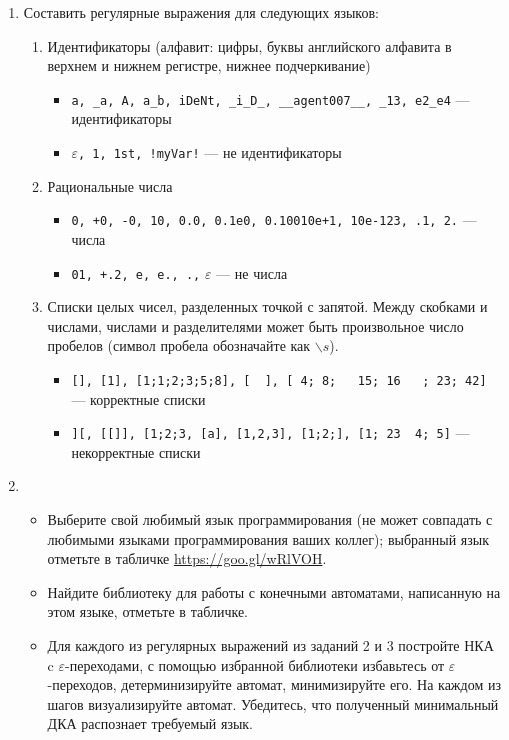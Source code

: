 \documentclass[12pt]{article}
\begin{document}
\begin{enumerate}
  \item
  { Составить регулярные выражения для следующих языков: 
    \begin{enumerate}
      \item 
      { Идентификаторы (алфавит: цифры, буквы английского алфавита в верхнем и нижнем регистре, нижнее подчеркивание)
        \begin{itemize}
          \item \verb;a, _a, A, a_b, iDeNt, _i_D_, __agent007__, _13, e2_e4; --- идентификаторы
          \item $\varepsilon$\verb;, 1, 1st, !myVar!; --- не идентификаторы
        \end{itemize}
      }
      \item 
      { Рациональные числа
        \begin{itemize} 
          \item \verb;0, +0, -0, 10, 0.0, 0.1e0, 0.10010e+1, 10e-123, .1, 2.; --- числа
          \item \verb;01, +.2, e, e., .,; $\varepsilon$ --- не числа
        \end{itemize}
      }
      \item
      { Списки целых чисел, разделенных точкой с запятой. Между скобками и числами, числами и разделителями может быть произвольное число пробелов (символ пробела обозначайте как $\backslash s$). 
        \begin{itemize} 
          \item \verb![], [1], [1;1;2;3;5;8], [  ], [ 4; 8;   15; 16   ; 23; 42]! --- корректные списки
          \item \verb!][, [[]], [1;2;3, [a], [1,2,3], [1;2;], [1; 23  4; 5]! --- некорректные списки
        \end{itemize}
      }
    \end{enumerate}
  }
  
  \item 
  { \begin{itemize}
      \item Выберите свой любимый язык программирования (не может совпадать с любимыми языками программирования ваших коллег); выбранный язык отметьте в табличке \href{https://goo.gl/wRlVOH}{https://goo.gl/wRlVOH}. 
      \item Найдите библиотеку для работы с конечными автоматами, написанную на этом языке, отметьте в табличке. 
      \item Для каждого из регулярных выражений из заданий 2 и 3 постройте НКА c $\varepsilon$-переходами, с помощью избранной библиотеки избавьтесь от $\varepsilon$-переходов, детерминизируйте автомат, минимизируйте его. На каждом из шагов визуализируйте автомат. Убедитесь, что полученный минимальный ДКА распознает требуемый язык. 
    \end{itemize}
  }
\end{enumerate}

\end{document}
